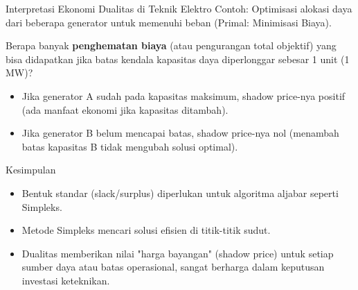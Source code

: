 \documentclass[aspectratio=169]{beamer}
\begin{document}
\begin{frame}{Interpretasi Ekonomi Dualitas di Teknik Elektro}
    Contoh: Optimisasi alokasi daya dari beberapa generator untuk memenuhi beban (Primal: Minimisasi Biaya).
    \vspace{0.5cm}
    \begin{tcolorbox}[colback=UNIBYellow!20,colframe=UNIBBlue,title=Makna Variabel Dual (Shadow Price)]
        Berapa banyak \textbf{penghematan biaya} (atau pengurangan total objektif) yang bisa didapatkan jika batas kendala kapasitas daya diperlonggar sebesar 1 unit (1 MW)?
    \end{tcolorbox}
    \begin{itemize}
        \item Jika generator A sudah pada kapasitas maksimum, shadow price-nya positif (ada manfaat ekonomi jika kapasitas ditambah).
        \item Jika generator B belum mencapai batas, shadow price-nya nol (menambah batas kapasitas B tidak mengubah solusi optimal).
    \end{itemize}
\end{frame}

\begin{frame}{Kesimpulan}
    \begin{itemize}
        \item Bentuk standar (slack/surplus) diperlukan untuk algoritma aljabar seperti Simpleks.
        \item Metode Simpleks mencari solusi efisien di titik-titik sudut.
        \item Dualitas memberikan nilai "harga bayangan" (shadow price) untuk setiap sumber daya atau batas operasional, sangat berharga dalam keputusan investasi keteknikan.
    \end{itemize}
\end{frame}
\end{document}
